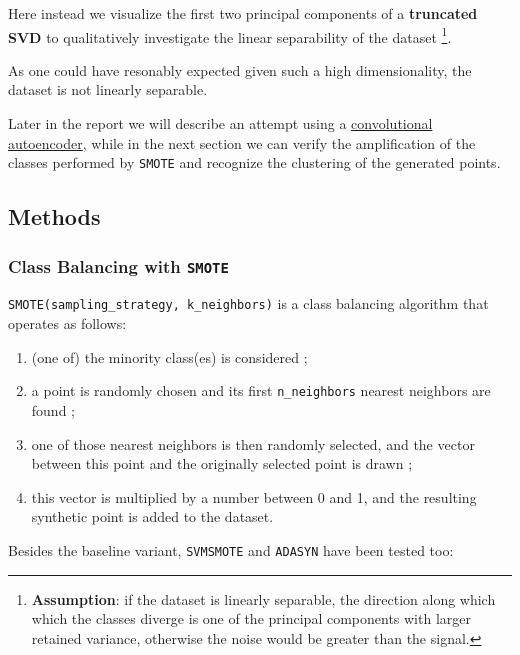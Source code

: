 \documentclass[10pt,]{article}
\providecommand{\tightlist}{%
  \setlength{\itemsep}{0pt}\setlength{\parskip}{0pt}}
\begin{document}
Here instead we visualize the first two principal components of a
\textbf{truncated SVD} to qualitatively investigate the linear
separability of the dataset \footnote{\textbf{Assumption}: if the
  dataset is linearly separable, the direction along which which the
  classes diverge is one of the principal components with larger
  retained variance, otherwise the noise would be greater than the
  signal.}.

As one could have resonably expected given such a high dimensionality,
the dataset is not linearly separable.

Later in the report we will describe an attempt using a
\protect\hyperlink{ae}{convolutional autoencoder}, while in the next
section we can verify the amplification of the classes performed by
\texttt{SMOTE} and recognize the clustering of the generated points.

\hypertarget{methods}{%
\subsection{\texorpdfstring{\textbf{Methods}}{Methods}}\label{methods}}

\hypertarget{smote}{%
\subsubsection{\texorpdfstring{Class Balancing with
\texttt{SMOTE}}{Class Balancing with SMOTE}}\label{smote}}

\texttt{SMOTE(sampling\_strategy,\ k\_neighbors)} is a class balancing
algorithm that operates as follows:

\begin{enumerate}
\def\labelenumi{\arabic{enumi}.}
\tightlist
\item
  (one of) the minority class(es) is considered ;
\item
  a point is randomly chosen and its first \texttt{n\_neighbors} nearest
  neighbors are found ;
\item
  one of those nearest neighbors is then randomly selected, and the
  vector between this point and the originally selected point is drawn ;
\item
  this vector is multiplied by a number between 0 and 1, and the
  resulting synthetic point is added to the dataset.
\end{enumerate}

Besides the baseline variant, \texttt{SVMSMOTE} and \texttt{ADASYN} have
been tested too:
\end{document}
